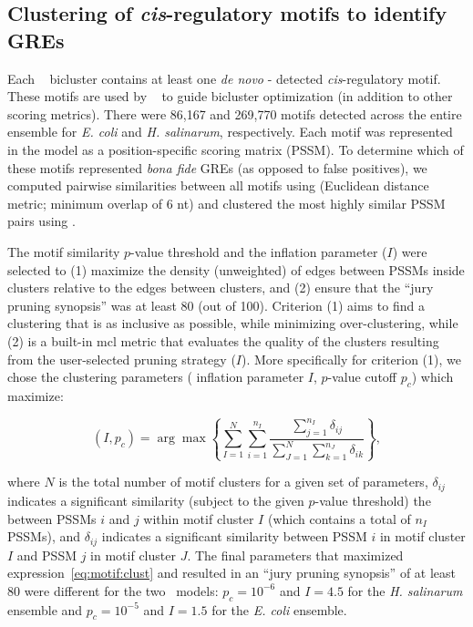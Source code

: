 \subsection{Clustering of \textit{cis}-regulatory motifs to identify GREs}
\label{section:gres}

Each \cm~ bicluster contains at least one {\it de novo} \MEME - detected \cite{bailey_methods_1998} {\it cis}-regulatory motif. These motifs are used by \cm~ to guide bicluster optimization (in addition to other scoring metrics). There were 86,167 and 269,770 motifs detected across the entire ensemble for {\it E. coli} and {\it H. salinarum}, respectively. Each motif was represented in the model as a position-specific scoring matrix (PSSM). To determine which of these motifs represented \textit{bona fide} GREs (as opposed to false positives), we computed pairwise similarities between all motifs using  \cite{gupta_quantifying_2007} (Euclidean distance metric; minimum overlap of 6 nt) and clustered the most highly similar PSSM pairs using  \cite{van_dongen_using_2012}.

The  motif similarity $p$-value threshold and the  inflation parameter ($I$) were selected to (1) maximize the density (unweighted) of edges between PSSMs inside clusters relative to the edges between clusters, and (2) ensure that the  ``jury pruning synopsis'' was at least 80 (out of 100). Criterion (1) aims to find a clustering that is as inclusive as possible, while minimizing over-clustering, while (2) is a built-in mcl metric that evaluates the quality of the clusters resulting from the user-selected pruning strategy ($I$). More specifically for criterion (1), we chose the clustering parameters ( inflation parameter $I$,  $p$-value cutoff $p_c$) which maximize:

\begin{equation}
\label{eq:motif:clust}
\left( I, p_c\right) = \arg \max \left\{ \sum_{I=1}^N \sum_{i=1}^{n_I} \frac{ \sum_{j=1}^{n_I} \delta_{ij} }
                            { \sum_{J=1}^N \sum_{k=1}^{n_J} \delta_{ik} } \right\},
\end{equation}

\noindent where $N$ is the total number of motif clusters for a given set of parameters, $\delta_{ij}$ indicates a significant similarity (subject to the given $p$-value threshold) the between PSSMs $i$ and $j$ within motif cluster $I$ (which contains a total of $n_I$ PSSMs), and $\delta_{ij}$ indicates a significant similarity between PSSM $i$ in motif cluster $I$ and PSSM $j$ in motif cluster $J$. The final parameters that maximized expression~\ref{eq:motif:clust} and resulted in an  ``jury pruning synopsis'' of at least 80 were different for the two \egrine~models: $p_c = 10^{-6}$ and  $I = 4.5$ for the {\it H. salinarum} ensemble and $p_c = 10^{-5}$ and  $I = 1.5$ for the {\it E. coli} ensemble.

